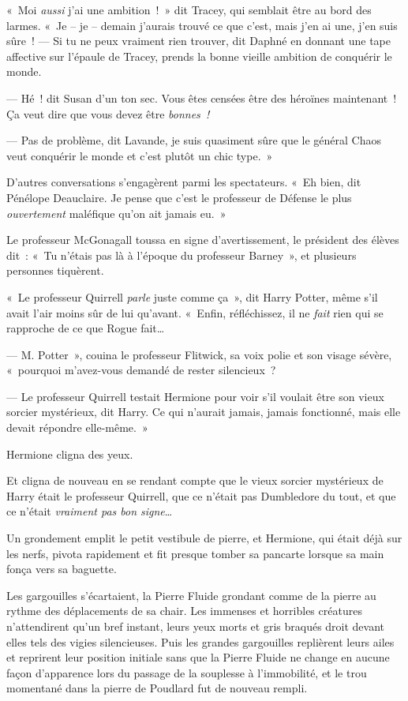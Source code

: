 «~Moi \emph{aussi} j'ai une ambition~!~»
dit Tracey, qui semblait être au bord des larmes.
«~Je -- je -- demain j'aurais trouvé ce que c'est, mais j'en ai une, j'en suis sûre~!
--- Si tu ne peux vraiment rien trouver, dit Daphné en donnant une tape affective sur l'épaule de Tracey, prends la bonne vieille ambition de conquérir le monde.

--- Hé~! dit Susan d'un ton sec.
Vous êtes censées être des héroïnes maintenant~!
Ça veut dire que vous devez être \emph{bonnes~!}

--- Pas de problème, dit Lavande, je suis quasiment sûre que le général Chaos veut conquérir le monde et c'est plutôt un chic type.~»

D'autres conversations s'engagèrent parmi les spectateurs.
«~Eh bien, dit Pénélope Deauclaire.
Je pense que c'est le professeur de Défense le plus \emph{ouvertement} maléfique qu'on ait jamais eu.~»

Le professeur McGonagall toussa en signe d'avertissement, le président des élèves dit~: «~Tu n'étais pas là à l'époque du professeur Barney~», et plusieurs personnes tiquèrent.

«~Le professeur Quirrell \emph{parle} juste comme ça~», dit Harry Potter, même s'il avait l'air moins sûr de lui qu'avant.
«~Enfin, réfléchissez, il ne \emph{fait} rien qui se rapproche de ce que Rogue fait…

--- M. Potter~», couina le professeur Flitwick, sa voix polie et son visage sévère, «~pourquoi m'avez-vous demandé de rester silencieux~?

--- Le professeur Quirrell testait Hermione pour voir s'il voulait être son vieux sorcier mystérieux, dit Harry.
Ce qui n'aurait jamais, jamais fonctionné, mais elle devait répondre elle-même.~»

Hermione cligna des yeux.

Et cligna de nouveau en se rendant compte que le vieux sorcier mystérieux de Harry était le professeur Quirrell, que ce n'était pas Dumbledore du tout, et que ce n'était \emph{vraiment pas bon signe}…

Un grondement emplit le petit vestibule de pierre, et Hermione, qui était déjà sur les nerfs, pivota rapidement et fit presque tomber sa pancarte lorsque sa main fonça vers sa baguette.

Les gargouilles s'écartaient, la Pierre Fluide grondant comme de la pierre au rythme des déplacements de sa chair.
Les immenses et horribles créatures n'attendirent qu'un bref instant, leurs yeux morts et gris braqués droit devant elles tels des vigies silencieuses.
Puis les grandes gargouilles replièrent leurs ailes et reprirent leur position initiale sans que la Pierre Fluide ne change en aucune façon d'apparence lors du passage de la souplesse à l'immobilité, et le trou momentané dans la pierre de Poudlard fut de nouveau rempli.

